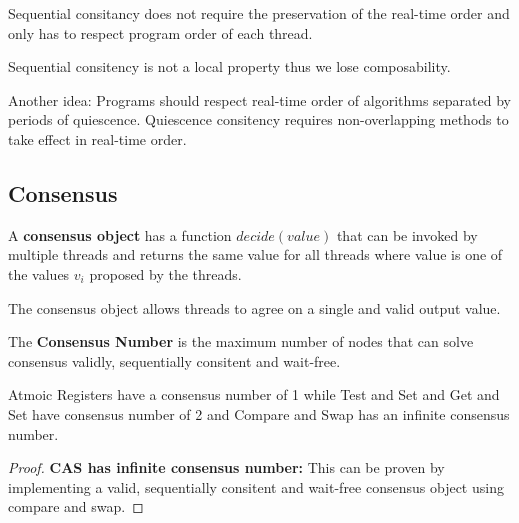 \begin{remark}
    Sequential consitancy does not require the preservation of the real-time order and only has to respect program order of each thread.
\end{remark}

\begin{theorem}
    Sequential consitency is not a local property thus we lose composability.
\end{theorem}

\begin{remark}
    Another idea: Programs should respect real-time order of algorithms separated by periods of quiescence. Quiescence consitency requires non-overlapping methods to take effect in real-time order.
\end{remark}

\subsection{Consensus}

\begin{definition}
    A \textbf{consensus object} has a function $decide(value)$ that can be invoked by multiple threads and returns the same value for all threads where value is one of the values $v_i$ proposed by the threads.
\end{definition}

\begin{remark}
    The consensus object allows threads to agree on a single and valid output value.
\end{remark}

\begin{definition}
    The \textbf{Consensus Number} is the maximum number of nodes that can solve consensus validly, sequentially consitent and wait-free.
\end{definition}

\begin{theorem}
    Atmoic Registers have a consensus number of 1 while Test and Set and Get and Set have consensus number of 2 and Compare and Swap has an infinite consensus number.
\end{theorem}

\begin{proof}
    \textbf{CAS has infinite consensus number:}
    This can be proven by implementing a valid, sequentially consitent and wait-free consensus object using compare and swap.
\end{proof}

